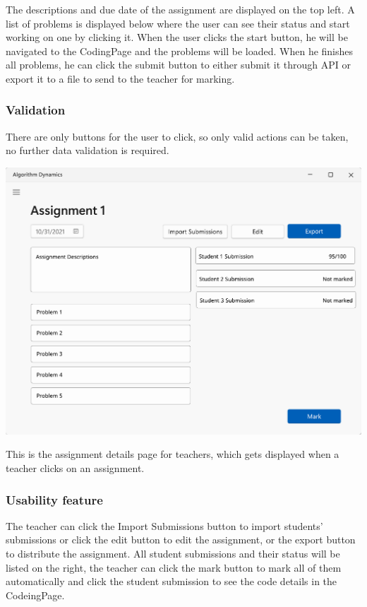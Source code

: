 \documentclass[a4paper]{report}
\begin{document}
The descriptions and due date of the assignment are displayed on the top left. A list of problems is displayed below where the user can see their status and start working on one by clicking it. When the user clicks the start button, he will be navigated to the CodingPage and the problems will be loaded. When he finishes all problems, he can click the submit button to either submit it through API or export it to a file to send to the teacher for marking.

\subsubsection{Validation}

There are only buttons for the user to click, so only valid actions can be taken, no further data validation is required.

\includegraphics[width=\textwidth, height=\textheight, keepaspectratio]{AssignmentsTeacherDetailsPage-design}

This is the assignment details page for teachers, which gets displayed when a teacher clicks on an assignment.

\subsubsection{Usability feature}

The teacher can click the Import Submissions button to import students' submissions or click the edit button to edit the assignment, or the export button to distribute the assignment. All student submissions and their status will be listed on the right, the teacher can click the mark button to mark all of them automatically and click the student submission to see the code details in the CodeingPage.
\end{document}
